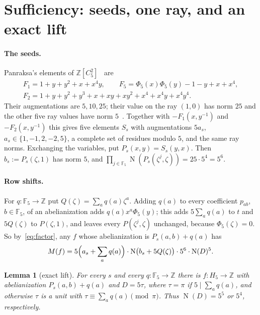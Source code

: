 \documentclass[11pt]{article}
\newtheorem{lemma}{Lemma}
\theoremstyle{definition}
\theoremstyle{remark}
\newcommand{\F}{\mathbb F_5}
\newcommand{\Z}{\mathbb Z}
\newcommand{\N}{\operatorname{N}}
\begin{document}
\section{Sufficiency: seeds, one ray, and an exact lift}\label{sec:sufficiency}

\paragraph{The seeds.} Panraksa's elements of $\Z[C_5^2]$~\cite[(12)--(14),
Proposition~3.1]{pan25} are
\begin{gather*}
F_1=1+y+y^2+x+x^4y,\qquad F_5=\Phi_5(x)\Phi_5(y)-1-y+x+x^4,\\
F_2=1+y+y^2+y^3+x+xy+xy^2+x^4+x^4y+x^4y^4 .
\end{gather*}
Their augmentations are $5,10,25$; their value on the ray $(1,0)$ has norm
$25$ and the other five ray values have norm $5$~\cite[proof of
Proposition~3.1]{pan25}. Together with $-F_1(x,y^{-1})$ and $-F_2(x,y^{-1})$
this gives five elements $S_s$ with augmentations $5a_s$,
$a_s\in\{1,-1,2,-2,5\}$, a complete set of residues modulo $5$, and the same
ray norms. Exchanging the variables, put $P_s(x,y)=S_s(y,x)$. Then
$b_s:=P_s(\zeta,1)$ has norm $5$, and $\prod_{j\in\F}\N(P_s(\zeta^j,\zeta))=25\cdot5^4=5^6$.

\paragraph{Row shifts.} For $q:\F\to\Z$ put $Q(\zeta)=\sum_aq(a)\zeta^a$. Adding
$q(a)$ to every coefficient $p_{ab}$, $b\in\F$, of an abelianization adds
$q(a)x^a\Phi_5(y)$; this adds $5\sum_aq(a)$ to $t$ and $5Q(\zeta)$ to
$P(\zeta,1)$, and leaves every $P(\zeta^j,\zeta)$ unchanged, because
$\Phi_5(\zeta)=0$. So by~\eqref{eq:factor}, any $f$ whose abelianization is
$P_s(a,b)+q(a)$ has
\begin{equation}\label{eq:rows}
M(f)=5\Bigl(a_s+\sum_aq(a)\Bigr)\cdot\N\bigl(b_s+5Q(\zeta)\bigr)\cdot5^6\cdot\N(D)^5 .
\end{equation}

\begin{lemma}[exact lift]\label{lem:lift}
For every $s$ and every $q:\F\to\Z$ there is $f:H_5\to\Z$ with abelianization
$P_s(a,b)+q(a)$ and $D=5\tau$, where $\tau=\pi$ if $5\mid\sum_aq(a)$, and
otherwise $\tau$ is a unit with $\tau\equiv\sum_aq(a)\pmod\pi$. Thus
$\N(D)=5^5$ or $5^4$, respectively.
\end{lemma}
\end{document}
